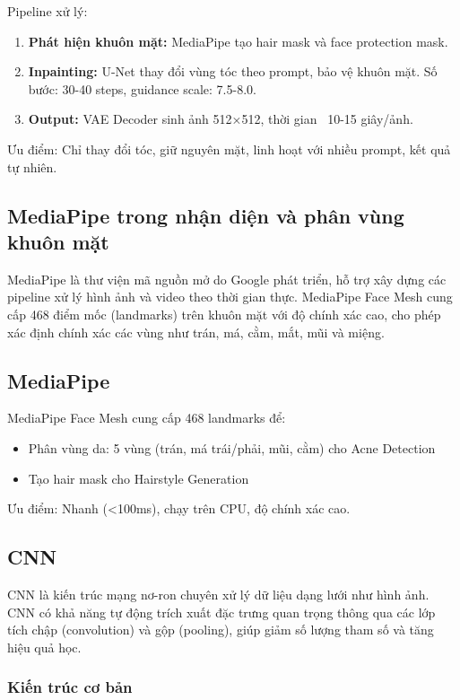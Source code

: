 Pipeline xử lý:
\begin{enumerate}
    \item \textbf{Phát hiện khuôn mặt:} MediaPipe tạo hair mask và face protection mask.
    \item \textbf{Inpainting:} U-Net thay đổi vùng tóc theo prompt, bảo vệ khuôn mặt. 
          Số bước: 30-40 steps, guidance scale: 7.5-8.0.
    \item \textbf{Output:} VAE Decoder sinh ảnh 512×512, thời gian ~10-15 giây/ảnh.
\end{enumerate}

Ưu điểm: Chỉ thay đổi tóc, giữ nguyên mặt, linh hoạt với nhiều prompt, kết quả tự nhiên.

\subsection{MediaPipe trong nhận diện và phân vùng khuôn mặt}

MediaPipe là thư viện mã nguồn mở do Google phát triển, hỗ trợ xây dựng các pipeline xử lý hình ảnh và video theo thời gian thực. MediaPipe Face Mesh cung cấp 468 điểm mốc (landmarks) trên khuôn mặt với độ chính xác cao, cho phép xác định chính xác các vùng như trán, má, cằm, mắt, mũi và miệng.

\subsection{MediaPipe}

MediaPipe Face Mesh cung cấp 468 landmarks để:
\begin{itemize}
    \item Phân vùng da: 5 vùng (trán, má trái/phải, mũi, cằm) cho Acne Detection
    \item Tạo hair mask cho Hairstyle Generation
\end{itemize}

Ưu điểm: Nhanh (<100ms), chạy trên CPU, độ chính xác cao.

\subsection{CNN}

CNN là kiến trúc mạng nơ-ron chuyên xử lý dữ liệu dạng lưới như hình ảnh. CNN có khả năng tự động trích xuất đặc trưng quan trọng thông qua các lớp tích chập (convolution) và gộp (pooling), giúp giảm số lượng tham số và tăng hiệu quả học.

\subsubsection{Kiến trúc cơ bản}

